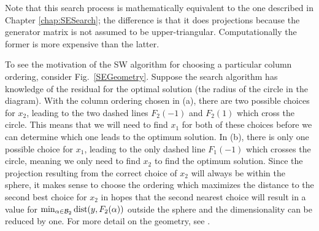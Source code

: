\documentclass[12pt,Bold,letterpaper]{mcgilletdclass}
\newcommand{\dist}{\mathrm{dist}}
\begin{document}
Note that this search process is mathematically equivalent to the one described in Chapter
\ref{chap:SESearch}; the difference is that it  does projections
because  the generator matrix is not assumed to be upper-triangular. 
Computationally the former is more expensive than the latter.

To see the motivation of the SW algorithm for choosing a particular column ordering,
consider Fig.\ \ref{SEGeometry}. Suppose the search algorithm has knowledge of
the residual for the optimal solution (the radius of the circle in the diagram).
With the column ordering chosen in (a), there are two possible choices for $x_2$,
leading to the two dashed lines $F_2(-1)$ and $F_2(1)$ which cross the circle. This means
that we will need to find $x_1$ for both of these choices
before we can determine which one leads to the optimum solution. In (b), there
is only one possible choice for $x_1$,  leading to the only dashed line $F_1(-1)$
which crosses the circle, meaning we only need to find $x_2$ to find the optimum solution.
Since the projection resulting from the correct choice of $x_2$ will always be
within the sphere, it makes sense to choose the ordering which maximizes the
distance to the second best choice for $x_2$ in hopes that the second nearest
choice will result in a value for $\min_{\alpha\in {\cal B}_2}\dist(y,F_2(\alpha))$ outside the sphere and the
dimensionality can be reduced by one. 
For more detail on the geometry, see  \cite{SuW05}.
\end{document}
